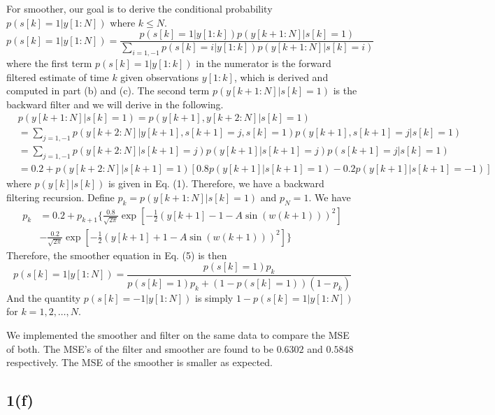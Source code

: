 \documentclass[a4paper, 11pt]{article}
\begin{document}
For smoother, our goal is to derive the conditional probability $p(s[k]=1|y[1:N])$ where $k \leq N$. 
\begin{equation}
p(s[k]=1|y[1:N]) = \frac{p(s[k]=1|y[1:k])p(y[k+1:N]|s[k]=1)}{\sum_{i=1,-1}p(s[k]=i|y[1:k])p(y[k+1:N]|s[k]=i)}
\end{equation}
where the first term $p(s[k]=1|y[1:k])$ in the numerator is the forward filtered estimate of time $k$ given observations $y[1:k]$, which is derived and computed in part (b) and (c). The second term $p(y[k+1:N]|s[k]=1)$ is the backward filter and we will derive in the following. 
\begin{equation}
\begin{split}
 & p(y[k+1:N]|s[k]=1) = p(y[k+1], y[k+2:N]|s[k] = 1)\\
 & = \sum_{j=1,-1} p(y[k+2:N]|y[k+1], s[k+1]=j, s[k]=1)p(y[k+1], s[k+1]=j|s[k]=1)\\
 & = \sum_{j=1,-1} p(y[k+2:N]|s[k+1]=j)p(y[k+1]|s[k+1]=j)p(s[k+1]=j|s[k]=1)\\
 & = 0.2 + p(y[k+2:N]|s[k+1]=1)\left[0.8p(y[k+1]|s[k+1]=1)-0.2p(y[k+1]|s[k+1]=-1) \right]
\end{split}
\end{equation}
where $p(y[k]|s[k])$ is given in Eq. (1). Therefore, we have a backward filtering recursion. Define $p_k = p(y[k+1:N]|s[k]=1)$ and $p_N = 1$. We have 
\begin{equation}
\begin{split}
p_k & = 0.2 + p_{k+1}\Bigg\{\frac{0.8}{\sqrt{2\pi}}\exp\left[-\frac{1}{2}\left(y[k+1] - 1 - A\sin(w(k+1)) \right)^2 \right] \\
 & - \frac{0.2}{\sqrt{2\pi}}\exp\left[-\frac{1}{2}\left(y[k+1] + 1 - A\sin(w(k+1)) \right)^2 \right]  \Bigg\}
\end{split}
\end{equation}
Therefore, the smoother equation in Eq. (5) is then 
\begin{equation}
p(s[k]=1|y[1:N]) = \frac{p(s[k]=1)p_k}{p(s[k]=1)p_k + (1-p(s[k]=1))(1-p_k)}
\end{equation}
And the quantity $p(s[k]=-1|y[1:N])$ is simply $1-p(s[k]=1|y[1:N])$ for $k = 1,2,\dots, N$.

We implemented the smoother and filter on the same data to compare the MSE of both. The MSE's of the filter and smoother are found to be $0.6302$ and $0.5848$ respectively. The MSE of the smoother is smaller as expected. 



\subsection*{1(f)}
\end{document}
